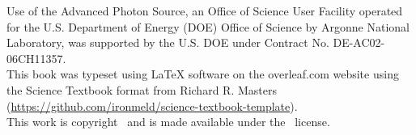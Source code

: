 \documentclass{book}
\makeatletter
\newcommand{\bookauthor}{\@author}
\makeatother
\begin{document}
\begin{flushleft}
Use of the Advanced Photon Source, an Office of Science User Facility operated for the U.S. Department of Energy (DOE) Office of Science by Argonne National Laboratory, was supported by the U.S. DOE under Contract No. DE-AC02-06CH11357. \\
\vspace*{\fill}
This book was typeset using \LaTeX{} software on the overleaf.com website using the Science Textbook format from Richard R. Masters (\url{https://github.com/ironmeld/science-textbook-template}).\\
\vspace{\fill}
This work is copyright \textcopyright{} \the\year{} \bookauthor\ and is made available under the \booklicense\ 
license.\end{flushleft}

\addtocounter{page}{2}






\setcounter{tocdepth}{3}
\tableofcontents

\mainmatter



\backmatter
{}
\printindex
\ifKindle
\fi

\ifCover
     
\fi
\end{document}
